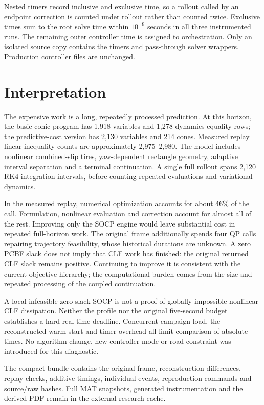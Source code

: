 \documentclass[11pt]{article}
\begin{document}
Nested timers record inclusive and exclusive time, so a rollout called by an
endpoint correction is counted under rollout rather than counted twice.
Exclusive times sum to the root solve time within $10^{-9}$ seconds in all
three instrumented runs. The remaining outer controller time is assigned to
orchestration. Only an isolated source copy contains the timers and pass-through
solver wrappers. Production controller files are unchanged.

\section{Interpretation}
The expensive work is a long, repeatedly processed prediction. At this horizon,
the basic conic program has 1,918 variables and 1,278 dynamics equality rows;
the predictive-cost version has 2,130 variables and 214 cones. Measured replay
linear-inequality counts are approximately 2,975--2,980. The model includes
nonlinear combined-slip tires, yaw-dependent rectangle geometry, adaptive
interval separation and a terminal continuation. A single full rollout spans
2,120 RK4 integration intervals, before counting repeated evaluations and
variational dynamics.

In the measured replay, numerical optimization accounts for about 46\% of the
call. Formulation, nonlinear evaluation and correction account for almost all
of the rest. Improving only the SOCP engine would leave substantial cost in
repeated full-horizon work. The original frame additionally spends four QP
calls repairing trajectory feasibility, whose historical durations are unknown.
A zero PCBF slack does not imply that CLF work has finished: the original
returned CLF slack remains positive. Continuing to improve it is consistent
with the current objective hierarchy; the computational burden comes from the
size and repeated processing of the coupled continuation.

A local infeasible zero-slack SOCP is not a proof of globally impossible
nonlinear CLF dissipation. Neither the profile nor the original five-second
budget establishes a hard real-time deadline. Concurrent campaign load, the
reconstructed warm start and timer overhead all limit comparison of absolute
times. No algorithm change, new controller mode or road constraint was introduced
for this diagnostic.

The compact bundle  contains the original frame,
reconstruction differences, replay checks, additive timings, individual events,
reproduction commands and source/raw hashes. Full MAT snapshots, generated
instrumentation and the derived PDF remain in the external research cache.
\end{document}
